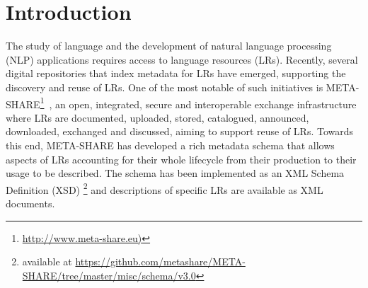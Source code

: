 \documentclass{llncs}
\begin{document}
\section{Introduction}
\label{sec:introduction}
The study of language and the development of natural language processing (NLP) applications requires access to language resources (LRs). %
Recently, several digital repositories that index metadata for LRs have emerged,
supporting the discovery and reuse of LRs. One of the most notable of such
initiatives is
META-SHARE\footnote{\url{http://www.meta-share.eu)}}~\cite{piperidis2012meta}, an open,
integrated, secure and interoperable exchange infrastructure where LRs are
documented, uploaded, stored, catalogued, announced, downloaded, exchanged and
discussed, aiming to support reuse of LRs. Towards this end, META-SHARE has
developed a rich metadata schema that allows aspects of LRs accounting for their
whole lifecycle from their production to their usage to be described. The schema
has been implemented as an XML Schema Definition (XSD) \footnote{available at \url{https://github.com/metashare/META-SHARE/tree/master/misc/schema/v3.0}} and descriptions of specific LRs are available as XML documents.
\end{document}
